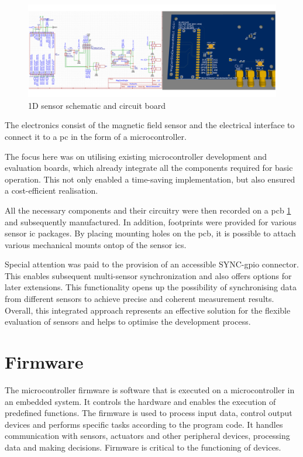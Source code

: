 \begin{figure}
\centering
\includegraphics{./generated_images/border_1D_sensor_schematic_and_circuit_board.png}
\caption{1D sensor schematic and circuit board
\label{1D_sensor_schematic_and_circuit_board.png}}
\end{figure}

The electronics consist of the magnetic field sensor and the electrical
interface to connect it to a \gls{pc} in the form of a microcontroller.

The focus here was on utilising existing microcontroller development and
evaluation boards, which already integrate all the components required
for basic operation. This not only enabled a time-saving implementation,
but also ensured a cost-efficient realisation.

All the necessary components and their circuitry were then recorded on a
\gls{pcb} \ref{1D_sensor_schematic_and_circuit_board.png} and
subsequently manufactured. In addition, footprints were provided for
various sensor \gls{ic} packages. By placing mounting holes on the
\gls{pcb}, it is possible to attach various mechanical mounts ontop of
the sensor \gls{ic}s.

Special attention was paid to the provision of an accessible
SYNC-\gls{gpio} connector. This enables subsequent multi-sensor
synchronization and also offers options for later extensions. This
functionality opens up the possibility of synchronising data from
different sensors to achieve precise and coherent measurement results.
Overall, this integrated approach represents an effective solution for
the flexible evaluation of sensors and helps to optimise the development
process.

\hypertarget{firmware}{%
\section{Firmware}\label{firmware}}

The microcontroller firmware is software that is executed on a
microcontroller in an embedded system. It controls the hardware and
enables the execution of predefined functions. The firmware is used to
process input data, control output devices and performs specific tasks
according to the program code. It handles communication with sensors,
actuators and other peripheral devices, processing data and making
decisions. Firmware is critical to the functioning of devices.

